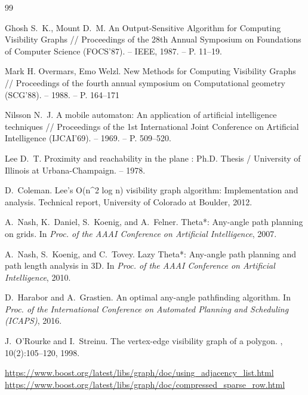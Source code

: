 \documentclass{article}
\theoremstyle{definition}
\begin{document}
\begin{thebibliography}{99}

    Ghosh S.~K., Mount D.~M. An Output-Sensitive Algorithm for Computing Visibility Graphs //
    Proceedings of the 28th Annual Symposium on Foundations of Computer Science (FOCS'87). 
    -- IEEE, 1987. -- P. 11--19.

    Mark H. Overmars, Emo Welzl. New Methods for Computing Visibility Graphs //
    Proceedings of the fourth annual symposium on Computational geometry (SCG'88).
    -- 1988. -- P. 164–171
    
    Nilsson N.~J. A mobile automaton: An application of artificial intelligence techniques //
    Proceedings of the 1st International Joint Conference on Artificial Intelligence (IJCAI'69). 
    -- 1969. -- P. 509--520.

    Lee D.~T. Proximity and reachability in the plane : Ph.D. Thesis / University of Illinois 
    at Urbana-Champaign. -- 1978.
    
    D.~Coleman.
    \newblock Lee's O(n\string^2 log n) visibility graph algorithm: Implementation and analysis.
    \newblock Technical report, University of Colorado at Boulder, 2012.

    A.~Nash, K.~Daniel, S.~Koenig, and A.~Felner.
    \newblock Theta*: Any-angle path planning on grids.
    \newblock In {\em Proc. of the AAAI Conference on Artificial Intelligence}, 2007.

    A.~Nash, S.~Koenig, and C.~Tovey.
    \newblock Lazy Theta*: Any-angle path planning and path length analysis in 3D.
    \newblock In {\em Proc. of the AAAI Conference on Artificial Intelligence}, 2010.

    D.~Harabor and A.~Grastien.
    \newblock An optimal any-angle pathfinding algorithm.
    \newblock In {\em Proc. of the International Conference on Automated Planning and
      Scheduling (ICAPS)}, 2016.

    J.~O'Rourke and I.~Streinu.
    \newblock The vertex-edge visibility graph of a polygon.
    , 10(2):105–120, 1998.

    \url{https://www.boost.org/latest/libs/graph/doc/using_adjacency_list.html}
    \url{https://www.boost.org/latest/libs/graph/doc/compressed_sparse_row.html}


\end{thebibliography}
\end{document}
